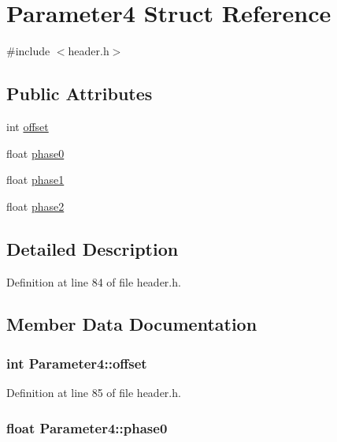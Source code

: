 \hypertarget{structParameter4}{
\section{Parameter4 Struct Reference}
\label{structParameter4}
}


{\ttfamily \#include $<$header.h$>$}\subsection*{Public Attributes}
\begin{DoxyCompactItemize}
\item 
int \hyperlink{structParameter4_a02cfa907db4f8a9320d041f69e22542c}{offset}
\item 
float \hyperlink{structParameter4_a0e88550ca9dcfbf9090915a21bdca60c}{phase0}
\item 
float \hyperlink{structParameter4_ab855decf808ae2529c62ec0348dcc347}{phase1}
\item 
float \hyperlink{structParameter4_a8d3535573e5515e839ba7c1606277b00}{phase2}
\end{DoxyCompactItemize}


\subsection{Detailed Description}


Definition at line 84 of file header.h.

\subsection{Member Data Documentation}
\hypertarget{structParameter4_a02cfa907db4f8a9320d041f69e22542c}{
\subsubsection[{offset}]{\setlength{\rightskip}{0pt plus 5cm}int {\bf Parameter4::offset}}}
\label{structParameter4_a02cfa907db4f8a9320d041f69e22542c}


Definition at line 85 of file header.h.\hypertarget{structParameter4_a0e88550ca9dcfbf9090915a21bdca60c}{
\subsubsection[{phase0}]{\setlength{\rightskip}{0pt plus 5cm}float {\bf Parameter4::phase0}}}
\label{structParameter4_a0e88550ca9dcfbf9090915a21bdca60c}


